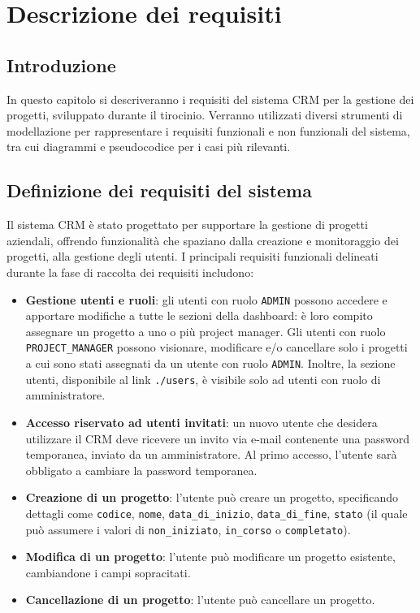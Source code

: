 \documentclass[target=bach,aauheader=,style=]{thud}
\begin{document}
\chapter{Descrizione dei requisiti}

\section{Introduzione}
In questo capitolo si descriveranno i requisiti del sistema CRM per la gestione dei progetti, sviluppato durante il tirocinio. Verranno utilizzati diversi strumenti di modellazione per rappresentare i requisiti funzionali e non funzionali del sistema, tra cui diagrammi e pseudocodice per i casi più rilevanti.

\section{Definizione dei requisiti del sistema}
Il sistema CRM è stato progettato per supportare la gestione di progetti aziendali, offrendo funzionalità che spaziano dalla creazione e monitoraggio dei progetti, alla gestione degli utenti. I principali requisiti funzionali delineati durante la fase di raccolta dei requisiti includono:

\begin{itemize}
    \item \textbf{Gestione utenti e ruoli}: gli utenti con ruolo \texttt{ADMIN} possono accedere e apportare modifiche a tutte le sezioni della dashboard: è loro compito assegnare un progetto a uno o più project manager. Gli utenti con ruolo \texttt{PROJECT\_MANAGER} possono visionare, modificare e/o cancellare solo i progetti a cui sono stati assegnati da un utente con ruolo \texttt{ADMIN}. Inoltre, la sezione utenti, disponibile al link \texttt{./users}, è visibile solo ad utenti con ruolo di amministratore.
    \item \textbf{Accesso riservato ad utenti invitati}: un nuovo utente che desidera utilizzare il CRM deve ricevere un invito via e-mail contenente una password temporanea, inviato da un amministratore. Al primo accesso, l'utente sarà obbligato a cambiare la password temporanea.
    \item \textbf{Creazione di un progetto}: l'utente può creare un progetto, specificando dettagli come \texttt{codice}, \texttt{nome}, \texttt{data\_di\_inizio}, \texttt{data\_di\_fine}, \texttt{stato} (il quale può assumere i valori di \texttt{non\_iniziato}, \texttt{in\_corso} o \texttt{completato}).
    \item \textbf{Modifica di un progetto}: l'utente può modificare un progetto esistente, cambiandone i campi sopracitati.
    \item \textbf{Cancellazione di un progetto}: l'utente può cancellare un progetto. 
\end{itemize}
\end{document}
